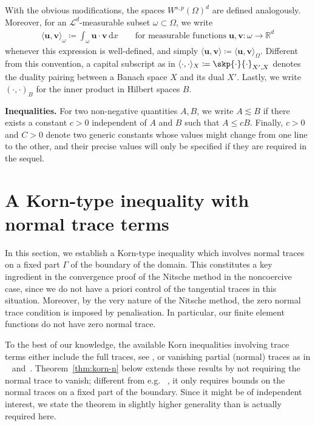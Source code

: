 \documentclass[reqno,a4paper]{amsart}
\def\vec#1{\boldsymbol{#1}}
\def\R{\mathbb{R}}
\def\bu{\vec{u}}
\def\bv{\vec{v}}
\begin{document}
	With the obvious modifications, the spaces $W^{s,p}(\Omega)^{d}$ are defined analogously. 
	Moreover, for an $\mathcal{L}^{d}$-measurable subset $\omega\subset\Omega$, we write 
	\begin{align*}
		\langle \bu,\bv\rangle_{\omega} \coloneqq \int_{\omega}\bu\cdot \bv\,\mathrm{d}x\qquad \text{for measurable functions}\;\bu,\bv\colon\omega\to\R^{d}
	\end{align*}
	whenever this expression is well-defined, and simply $\langle \bu,\bv\rangle \coloneqq \langle \bu,\bv\rangle_{\Omega}$. 
	Different from this convention, a capital subscript as in $\langle\cdot,\cdot\rangle_{X} \coloneqq \skp{\cdot}{\cdot}_{X',X}$ denotes the duality pairing between a Banach space $X$ and its dual $X'$. 
	Lastly, we write $(\cdot,\cdot)_{B}$ for the inner product in Hilbert spaces $B$.
	
	\textbf{Inequalities.} 	
	For two non-negative quantities $A,B$, we write $A\lesssim  B$ if there exists a constant $c>0$ independent of $A$ and $B$ such that $A\leq cB$. 
	Finally, $c>0$ and $C>0$ denote two generic constants whose values might change from one line to the other, and their precise values will only be specified if they are required in the sequel. 
	
	\section{A Korn-type inequality with normal trace terms}
	\label{sec:korn}
	In this section, we establish a Korn-type inequality which involves normal traces on a fixed part $\Gamma$ of the boundary of the domain. 
	This constitutes a key ingredient in the convergence proof of the Nitsche method in the noncoercive case, since we do not have a priori control of the tangential traces in this situation. 
	Moreover, by the very nature of the Nitsche method, the zero normal trace condition is imposed by penalisation. In particular, our finite element functions do not have zero normal trace.
	
	To the best of our knowledge, the available Korn inequalities involving trace terms either include the full traces, see \cite{Pompe2003}, or vanishing partial (normal) traces as in ~\cite{DesvillettesVillani2002} and~\cite{BP.2016,Bauer2016}. 
	Theorem~\ref{thm:korn-n} below extends these results by not requiring the normal trace to vanish; different from e.g. ~\cite{BulicekMalekRajagopal2007}, it only requires bounds on the normal traces on a fixed part of the boundary.
 Since it might be of independent interest, we state the theorem in slightly higher generality than is actually required here. 
	
\end{document}
